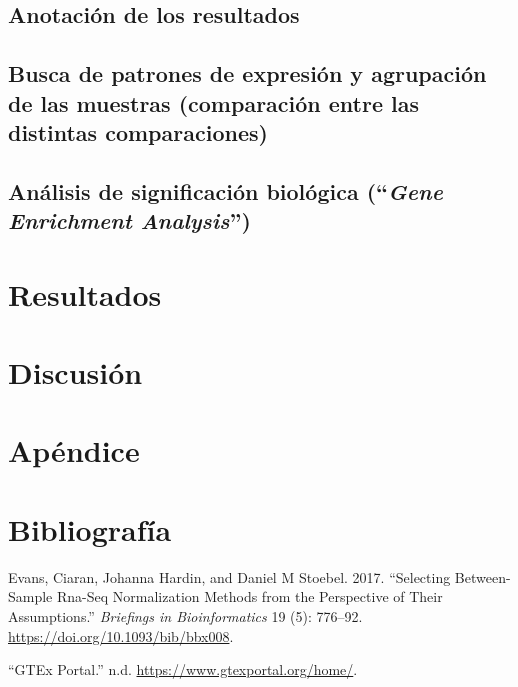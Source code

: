 \documentclass[
  english,
]{article}
\begin{document}
\hypertarget{anotaciuxf3n-de-los-resultados}{%
\subsection{Anotación de los
resultados}\label{anotaciuxf3n-de-los-resultados}}

\hypertarget{busca-de-patrones-de-expresiuxf3n-y-agrupaciuxf3n-de-las-muestras-comparaciuxf3n-entre-las-distintas-comparaciones}{%
\subsection{Busca de patrones de expresión y agrupación de las muestras
(comparación entre las distintas
comparaciones)}\label{busca-de-patrones-de-expresiuxf3n-y-agrupaciuxf3n-de-las-muestras-comparaciuxf3n-entre-las-distintas-comparaciones}}

\hypertarget{anuxe1lisis-de-significaciuxf3n-bioluxf3gica-gene-enrichment-analysis}{%
\subsection{\texorpdfstring{Análisis de significación biológica
(``\emph{Gene Enrichment
Analysis}'')}{Análisis de significación biológica (``Gene Enrichment Analysis'')}}\label{anuxe1lisis-de-significaciuxf3n-bioluxf3gica-gene-enrichment-analysis}}

\hypertarget{resultados}{%
\section{Resultados}\label{resultados}}

\hypertarget{discusiuxf3n}{%
\section{Discusión}\label{discusiuxf3n}}

\hypertarget{apuxe9ndice}{%
\section{Apéndice}\label{apuxe9ndice}}

\hypertarget{bibliografuxeda}{%
\section*{Bibliografía}\label{bibliografuxeda}}

\hypertarget{refs}{}
\leavevmode\hypertarget{ref-Normalization}{}%
Evans, Ciaran, Johanna Hardin, and Daniel M Stoebel. 2017. ``Selecting
Between-Sample Rna-Seq Normalization Methods from the Perspective of
Their Assumptions.'' \emph{Briefings in Bioinformatics} 19 (5): 776--92.
\url{https://doi.org/10.1093/bib/bbx008}.

\leavevmode\hypertarget{ref-GTEx}{}%
``GTEx Portal.'' n.d. \url{https://www.gtexportal.org/home/}.
\end{document}
